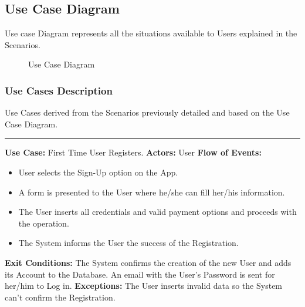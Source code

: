 \documentclass[a4paper]{article}
\begin{document}
\subsection{Use Case Diagram}
Use case Diagram represents all the situations available to Users explained in the Scenarios.
\begin{figure}[h]
\centering
\vspace*{\fill}
\noindent{}%
\caption {Use Case Diagram}
\vspace*{2cm}
\end{figure}
\newpage

\subsubsection{Use Cases Description}
Use Cases derived from the Scenarios previously detailed and based on the Use Case Diagram.
\begin{center}
\rule{8cm}{0.4pt}
\end{center}
\textbf{Use Case:} First Time User Registers.
\newline
\textbf{Actors:} User
\newline
\textbf{Flow of Events:}
\begin{itemize}
\item User selects the Sign-Up option on the App.
\item A form is presented to the User where he/she can fill her/his information.
\item The User inserts all credentials and valid payment options and proceeds with the operation.
\item The System informs the User the success of the Registration.
\end{itemize}
\textbf{Exit Conditions:} The System confirms the creation of the new User and adds its Account to the Database. An email with the User's Password is sent for her/him to Log in.
\newline
\textbf{Exceptions:} The User inserts invalid data so the System can't confirm the Registration.
\newline
\end{document}
